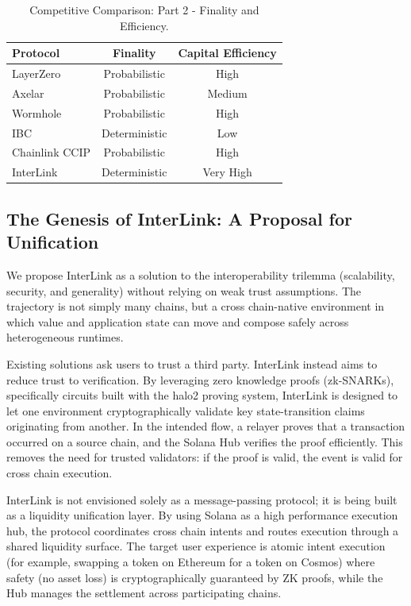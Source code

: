 \documentclass[11pt,a4paper]{article}
\begin{document}
\begin{table}[H]
\centering
\begin{tabular}{@{}lcc@{}}
\toprule
Protocol & Finality & Capital Efficiency \\
\midrule
LayerZero & Probabilistic & High \\
Axelar & Probabilistic & Medium \\
Wormhole & Probabilistic & High \\
IBC & Deterministic & Low \\
Chainlink CCIP & Probabilistic & High \\
InterLink & Deterministic & Very High \\
\bottomrule
\end{tabular}
\caption{Competitive Comparison: Part 2 - Finality and Efficiency.}
\end{table}

\subsection{The Genesis of InterLink: A Proposal for Unification}
We propose InterLink as a solution to the interoperability trilemma (scalability, security, and generality) without relying on weak trust assumptions. The trajectory is not simply many chains, but a cross chain-native environment in which value and application state can move and compose safely across heterogeneous runtimes.

Existing solutions ask users to trust a third party. InterLink instead aims to reduce trust to verification. By leveraging zero knowledge proofs (zk-SNARKs), specifically circuits built with the halo2 proving system, InterLink is designed to let one environment cryptographically validate key state-transition claims originating from another. In the intended flow, a relayer proves that a transaction occurred on a source chain, and the Solana Hub verifies the proof efficiently. This removes the need for trusted validators: if the proof is valid, the event is valid for cross chain execution.

InterLink is not envisioned solely as a message-passing protocol; it is being built as a liquidity unification layer. By using Solana as a high performance execution hub, the protocol coordinates cross chain intents and routes execution through a shared liquidity surface. The target user experience is atomic intent execution (for example, swapping a token on Ethereum for a token on Cosmos) where safety (no asset loss) is cryptographically guaranteed by ZK proofs, while the Hub manages the settlement across participating chains.
\end{document}
